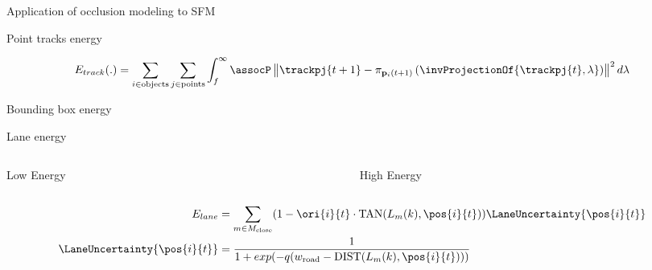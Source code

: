 \begin{frame}{Application of occlusion modeling to SFM}
\end{frame}

\begin{frame}{Point tracks energy}
  \centering
  \small{
  
  \begin{align*}
    \Energy{track}(.) = 
    \sum_{i \in \text{objects}}
    \sum_{j \in \text{points}}
    \int_{f}^{\infty}
      \assocP
      \left\|\trackpj{t+1} - \projectionOft{\invProjectionOf{\trackpj{t}, \lambda}}\right\|^2
      d\lambda
  \end{align*}
}
\end{frame}

\begin{frame}{Bounding box energy}
  \centering
  \begin{figure}
  
  \end{figure}
\end{frame}

\newcommand{\carbev}{
  \coordinate (ra) at (1,0.2);
  \coordinate (rb) at (2,0.7);
  \draw [thick,blue] (ra) rectangle (rb);
  \draw [thick,black] let \p1 = (ra), \p2 = (rb) in ($.5*(\x1, \y2) + .5*(\x1, \y1) + (-0.2,0)$) -- ($.5*(ra)+.5*(rb)$);
}
\begin{frame}{Lane energy}
      \centering
  \begin{columns}
    \begin{column}[t]{0.5\textwidth}
      \centering
      Low Energy

    \end{column}
    \begin{column}[t]{0.5\textwidth}
      \centering
      High Energy

    \end{column}
  \end{columns}
  \begin{align}
    \label{eq:laneOrientationEnergy}
    \Energy{lane} &= 
    \sum_{m \in M_{\text{close}}}
    (1 - \ori{i}{t} \cdot \text{TAN}(L_{m}(k), \pos{i}{t}) )
    \LaneUncertainty{\pos{i}{t}}
    \\
    \LaneUncertainty{\pos{i}{t}} &=
    \frac{1}{1 + exp(-q(w_{\text{road}} - \text{DIST}(L_{m}(k), \pos{i}{t})))}
  \end{align}
    
\end{frame}

